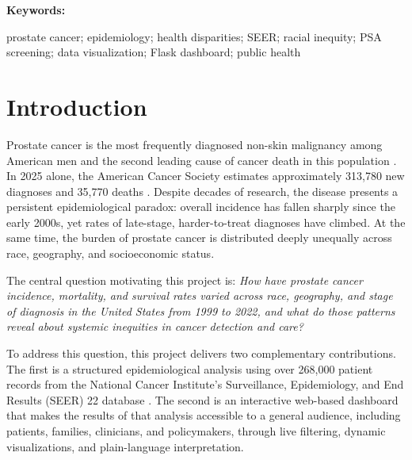 \documentclass[12pt]{article}
\newenvironment{keywords}{%
    \vspace{0.5em}\noindent\textbf{Keywords:}~
}{\par\vspace{1em}}
\begin{document}
\vspace{0.5cm}
\begin{keywords}
prostate cancer; epidemiology; health disparities; SEER; racial inequity;
PSA screening; data visualization; Flask dashboard; public health
\end{keywords}

\newpage
\doublespacing
\tableofcontents
\singlespacing
\newpage
\doublespacing

\section{Introduction}

Prostate cancer is the most frequently diagnosed non-skin malignancy among American
men and the second leading cause of cancer death in this population \cite{siegel2023}.
In 2025 alone, the American Cancer Society estimates approximately 313,780 new
diagnoses and 35,770 deaths \cite{siegel2023}. Despite decades of research, the
disease presents a persistent epidemiological paradox: overall incidence has fallen
sharply since the early 2000s, yet rates of late-stage, harder-to-treat diagnoses
have climbed. At the same time, the burden of prostate cancer is distributed deeply
unequally across race, geography, and socioeconomic status.

The central question motivating this project is: \textit{How have prostate cancer
incidence, mortality, and survival rates varied across race, geography, and stage of
diagnosis in the United States from 1999 to 2022, and what do those patterns reveal
about systemic inequities in cancer detection and care?}

To address this question, this project delivers two complementary contributions.
The first is a structured epidemiological analysis using over 268,000 patient records
from the National Cancer Institute's Surveillance, Epidemiology, and End Results
(SEER) 22 database \cite{seer2024}. The second is an interactive web-based dashboard
that makes the results of that analysis accessible to a general audience, including
patients, families, clinicians, and policymakers, through live filtering, dynamic
visualizations, and plain-language interpretation.
\end{document}
